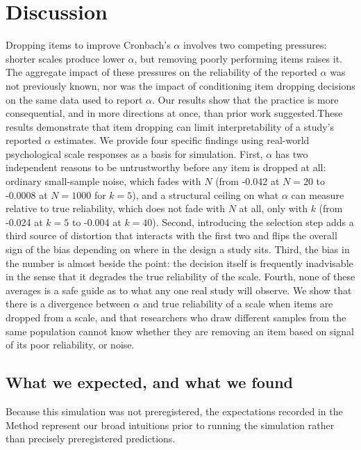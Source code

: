 \documentclass[
  nonatbib,
  authoryear,
  preprint]{elsarticle}
\begin{document}
\section{Discussion}\label{discussion}

Dropping items to improve Cronbach's \(\alpha\) involves two competing
pressures: shorter scales produce lower \(\alpha\), but removing poorly
performing items raises it. The aggregate impact of these pressures on
the reliability of the reported \(\alpha\) was not previously known, nor
was the impact of conditioning item dropping decisions on the same data
used to report \(\alpha\). Our results show that the practice is more
consequential, and in more directions at once, than prior work
suggested.These results demonstrate that item dropping can limit
interpretability of a study's reported \(\alpha\) estimates. We provide
four specific findings using real-world psychological scale responses as
a basis for simulation. First, \(\alpha\) has two independent reasons to
be untrustworthy before any item is dropped at all: ordinary
small-sample noise, which fades with \(N\) (from -0.042 at \(N = 20\) to
-0.0008 at \(N = 1000\) for \(k = 5\)), and a structural ceiling on what
\(\alpha\) can measure relative to true reliability, which does not fade
with \(N\) at all, only with \(k\) (from -0.024 at \(k = 5\) to -0.004
at \(k = 40\)). Second, introducing the selection step adds a third
source of distortion that interacts with the first two and flips the
overall sign of the bias depending on where in the design a study sits.
Third, the bias in the number is almost beside the point: the decision
itself is frequently inadvisable in the sense that it degrades the true
reliability of the scale. Fourth, none of these averages is a safe guide
as to what any one real study will observe. We show that there is a
divergence between \(\alpha\) and true reliability of a scale when items
are dropped from a scale, and that researchers who draw different
samples from the same population cannot know whether they are removing
an item based on signal of its poor reliability, or noise.

\subsection{What we expected, and what we
found}\label{what-we-expected-and-what-we-found}

Because this simulation was not preregistered, the expectations recorded
in the Method represent our broad intuitions prior to running the
simulation rather than precisely preregistered predictions.
\end{document}
